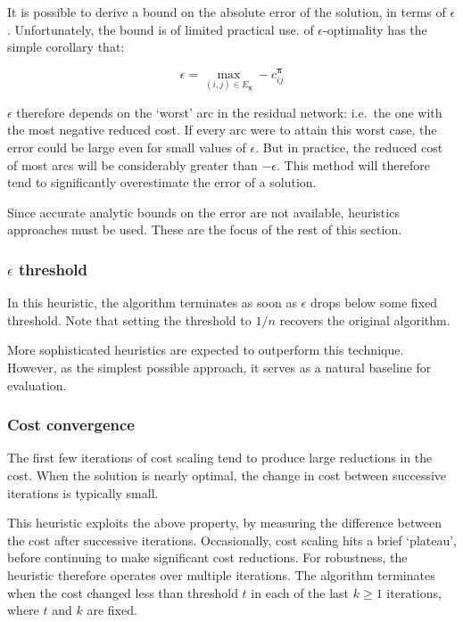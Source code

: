It is possible to derive a bound on the absolute error of the solution, in terms of $\epsilon$. Unfortunately, the bound is of limited practical use.  of $\epsilon$-optimality has the simple corollary that:

\[\epsilon = \max_{(i,j) \in E_\mathbf{x}} -c_{ij}^{\boldsymbol{\pi}}\]

$\epsilon$ therefore depends on the `worst' arc in the residual network: i.e.\ the one with the most negative reduced cost. If every arc were to attain this worst case, the error could be large even for small values of $\epsilon$. But in practice, the reduced cost of most arcs will be considerably greater than $-\epsilon$. This method will therefore tend to significantly overestimate the error of a solution.

Since accurate analytic bounds on the error are not available, heuristics approaches must be used. These are the focus of the rest of this section.

\subsubsection{$\epsilon$ threshold}

In this heuristic, the algorithm terminates as soon as $\epsilon$ drops below some fixed threshold. Note that setting the threshold to $1/n$ recovers the original algorithm.

More sophisticated heuristics are expected to outperform this technique. However, as the simplest possible approach, it serves as a natural baseline for evaluation.

\subsubsection{Cost convergence}

The first few iterations of cost scaling tend to produce large reductions in the cost. When the solution is nearly optimal, the change in cost between successive iterations is typically small.

This heuristic exploits the above property, by measuring the difference between the cost after successive iterations. Occasionally, cost scaling hits a brief `plateau', before continuing to make significant cost reductions. For robustness, the heuristic therefore operates over multiple iterations. The algorithm terminates when the cost changed less than threshold $t$ in each of the last $k \geq 1$ iterations, where $t$ and $k$ are fixed.

